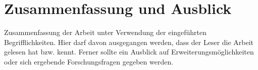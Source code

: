 
\chapter{Zusammenfassung und Ausblick}
  \label{Zusammenfassung}

Zusammenfassung der Arbeit unter Verwendung der eingeführten Begrifflichkeiten. Hier darf davon ausgegangen werden, dass der Leser die Arbeit gelesen hat bzw. kennt. Ferner sollte ein Ausblick auf Erweiterungsmöglichkeiten oder sich ergebende Forschungsfragen gegeben werden.
